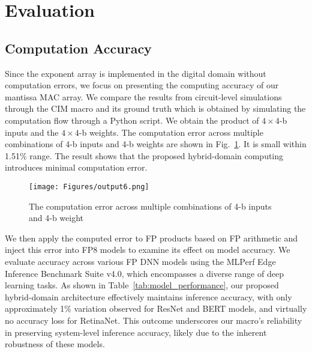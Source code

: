 \section{Evaluation}
\label{sec:Results}
\subsection{Computation Accuracy}

Since the exponent array is implemented in the digital domain without computation errors, we focus on presenting the computing accuracy of our mantissa MAC array.
We compare the results from circuit-level simulations through the CIM macro and its ground truth which
is obtained by simulating the computation flow through a Python script. 
We obtain the product of $4\times4$-b inputs and the $4\times4$-b weights.  
The computation error across multiple combinations of 4-b inputs and 4-b weights are shown in Fig.~\ref{computation error}.
It is small within 1.51\% range.
The result shows that the proposed hybrid-domain computing introduces minimal computation error.

\begin{figure}
    \centering
    \texttt{[image: Figures/output6.png]} %
     \vskip -6pt
    \caption{The
computation error across multiple combinations of 4-b inputs
and 4-b weight}
    \label{computation error}
     \vskip -15pt
\end{figure}




We then apply the computed error to FP products based on FP arithmetic and inject this error into FP8 models to examine its effect on model accuracy.
We evaluate accuracy across various FP DNN models using the MLPerf Edge Inference Benchmark Suite v4.0, which encompasses a diverse range of deep learning tasks. 
As shown in Table~\ref{tab:model_performance}, our proposed hybrid-domain architecture effectively maintains inference accuracy, with only approximately 1\% variation observed for ResNet and BERT models, and virtually no accuracy loss for RetinaNet. 
This outcome underscores our macro’s reliability in preserving system-level inference accuracy, likely due to the inherent robustness of these models.

